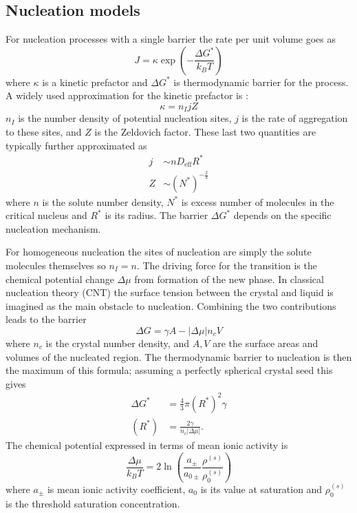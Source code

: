 \documentclass[11pt,twoside]{report}
\begin{document}
\subsection{Nucleation models}

For nucleation processes with a single barrier the rate per unit volume goes as
\begin{equation}\label{eq:nucleation-rate-barrier}
  J = \kappa \exp{\left(-\frac{\Delta G^{*}}{k_B T}\right)}
\end{equation}
where $\kappa$ is a kinetic prefactor and $\Delta G^*$ is thermodynamic barrier for the process.
A widely used approximation for the kinetic prefactor is \cite{SearJPCM2007}:
\begin{equation}
  \kappa = n_I j Z
\end{equation}
$n_I$ is the number density of potential nucleation sites, $j$ is the rate of aggregation to these sites, and $Z$ is the Zeldovich factor.
These last two quantities are typically further approximated as \cite{SearJPCM2007}
\begin{subequations}
  \begin{align}
    j &\sim n D_\mathrm{eff} R^* \\
    Z &\sim (N^*)^{-\tfrac{2}{3}}
  \end{align}
\end{subequations}
where $n$ is the solute number density, $N^*$ is excess number of molecules in the critical nucleus and $R^*$ is its radius.
The barrier $\Delta G^*$ depends on the specific nucleation mechanism.

For homogeneous nucleation the sites of nucleation are simply the solute molecules themselves so $n_I = n$.
The driving force for the transition is the chemical potential change $\Delta \mu$ from formation of the new phase.
In classical nucleation theory (CNT) the surface tension between the crystal and liquid is imagined as the main obstacle to nucleation.
Combining the two contributions leads to the barrier
\begin{equation}
  \Delta G = \gamma A - |\Delta \mu| n_c V
\end{equation}
where $n_c$ is the crystal number density, and $A, V$ are the surface areas and volumes of the nucleated region.
The thermodynamic barrier to nucleation is then the maximum of this formula; assuming a perfectly spherical crystal seed this gives
\begin{align}\label{eq:cnt-barrier}
  \Delta G^{*} &= \frac{4}{3} \pi (R^{*})^2 \gamma \\
  (R^{*}) &= \frac{2\gamma}{n_c |\Delta\mu|}.
\end{align}
The chemical potential expressed in terms of mean ionic activity is\cite{DesarnaudJPCL2014}
\begin{equation}
  \frac{\Delta \mu}{k_B T}
  =
  2 \ln{\left( \frac{a_\pm}{a_{0\pm}} \frac{\rho^{(s)}}{\rho^{(s)}_0} \right)}
\end{equation}
where $a_\pm$ is mean ionic activity coefficient, $a_0$ is its value at saturation and $\rho^{(s)}_0$ is the threshold saturation concentration.
\end{document}
